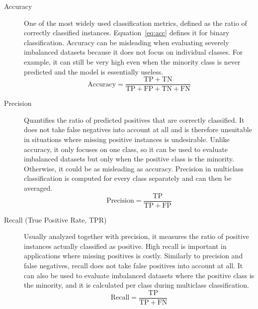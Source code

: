 \begin{description}
    \item[Accuracy] One of the most widely used classification metrics, defined as the ratio of correctly classified instances. Equation~\ref{eq:acc} defines it for binary classification. Accuracy can be misleading when evaluating severely imbalanced datasets because it does not focus on individual classes. For example, it can still be very high even when the minority class is never predicted and the model is essentially useless.~\cite{Terven2025, Szeliski2022}
    \begin{equation}\label{eq:acc}
        \text{Accuracy} = \frac{\mathrm{TP} + \mathrm{TN}}{\mathrm{TP} + \mathrm{FP} + \mathrm{TN} + \mathrm{FN}}
    \end{equation}

    \item[Precision] Quantifies the ratio of predicted positives that are correctly classified. It does not take false negatives into account at all and is therefore unsuitable in situations where missing positive instances is undesirable. Unlike accuracy, it only focuses on one class, so it can be used to evaluate imbalanced datasets but only when the positive class is the minority. Otherwise, it could be as misleading as accuracy. Precision in multiclass classification is computed for every class separately and can then be averaged.~\cite{Terven2025, Szeliski2022}
    \begin{equation}\label{eq:prec}
        \text{Precision} = \frac{\mathrm{TP}}{\mathrm{TP} + \mathrm{FP}}
    \end{equation}

    \item[Recall (True Positive Rate, TPR)] Usually analyzed together with precision, it measures the ratio of positive instances actually classified as positive. High recall is important in applications where missing positives is costly. Similarly to precision and false negatives, recall does not take false positives into account at all. It can also be used to evaluate imbalanced datasets where the positive class is the minority, and it is calculated per class during multiclass classification.~\cite{Terven2025, Szeliski2022}
    \begin{equation}\label{eq:rec}
        \text{Recall} = \frac{\mathrm{TP}}{\mathrm{TP} + \mathrm{FN}}
    \end{equation}


\end{description}
